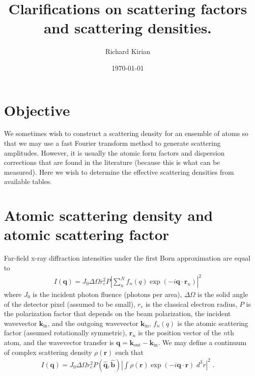\documentclass[11pt]{article}
\title{Clarifications on scattering factors and scattering densities.}
\author{Richard Kirian}
\date{\today}
\renewcommand{\vec}[1]{\boldsymbol{#1}}
\newcommand{\hvec}[1]{\hat{\vec{#1}}}
\begin{document}
 

\maketitle

\section{Objective}

We sometimes wish to construct a scattering density for an ensemble of atoms so that we may use a fast Fourier transform method to generate scattering amplitudes.  However, it is usually the atomic form factors and dispersion corrections that are found in the literature (because this is what can be measured).  Here we wish to determine the effective scattering densities from available tables.

\section{Atomic scattering density and atomic scattering factor}



Far-field x-ray diffraction intensities under the first Born approximation are equal to 
\begin{align}\label{eqn:qrf}
I(\vec{q}) = J_0 \Delta \Omega r_e^2 P \left| \sum_n^N f_n(q) \exp(-i \vec{q}\cdot\vec{r}_n)\right|^2
\end{align}
where $J_0$ is the incident photon fluence (photons per area), $\Delta \Omega$ is the solid angle of the detector pixel (assumed to be small), $r_e$ is the classical electron radius, $P$ is the polarization factor that depends on the beam polarization, the incident wavevector $\vec{k}_\text{in}$, and the outgoing wavevector $\vec{k}_\text{in}$, $f_n(q)$ is the atomic scattering factor (assumed rotationally symmetric), $\vec{r}_n$ is the position vector of the $n$th atom, and the wavevector transfer is $\vec{q} = \vec{k}_\text{out}-\vec{k}_\text{in}$.  We may define a continuum of complex scattering density $\rho(\vec{r})$ such that
\begin{align}\label{eqn:dft}
I(\vec{q}) = J_0 \Delta \Omega r_e^2 P(\hvec{q},\hvec{b}) \left| \int \rho(\vec{r}) \exp(-i \vec{q}\cdot\vec{r}) \; d^3r\right|^2 \; .
\end{align}
\end{document}
